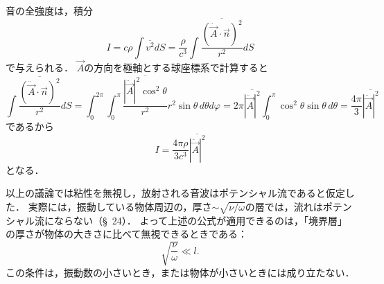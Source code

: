 音の全強度は，積分
\[
    I = c\rho \int \overline{v^2} dS 
    = \frac{\rho}{c^3} \int \frac{\overline{\left( \ddot{\vec{A}}\cdot\vec{n} \right)^2}}{r^2} dS
\]
で与えられる．
$\vec{A}$の方向を極軸とする球座標系で計算すると
\[
    \int \frac{\overline{\left( \ddot{\vec{A}}\cdot\vec{n} \right)^2}}{r^2} dS
    = \int_{0}^{2\pi} \int_{0}^{\pi} \frac{\overline{|\ddot{\vec{A}}|^2\cos^2\theta}}{r^2} r^2 \sin\theta \, d\theta d\varphi
    = 2\pi \overline{|\ddot{\vec{A}}|^2} \int_{0}^{\pi} \cos^2\theta \sin\theta \, d\theta
    = \frac{4\pi}{3} \overline{|\ddot{\vec{A}}|^2}
\]
であるから
\begin{equation}
    I = \frac{4\pi\rho}{3c^3} \overline{|\ddot{\vec{A}}|^2}
\end{equation}
となる．



以上の議論では粘性を無視し，放射される音波はポテンシャル流であると仮定した．
実際には，振動している物体周辺の，厚さ$\sim \sqrt{\nu/\omega}$の層では，流れはポテンシャル流にならない（\S~24）．
よって上述の公式が適用できるのは，「境界層」の厚さが物体の大きさに比べて無視できるときである：
\setcounter{equation}{19}%
\begin{equation}
    \sqrt{\frac{\nu}{\omega}} \ll l.
\end{equation}
この条件は，振動数の小さいとき，または物体が小さいときには成り立たない．




\BackToTheToc